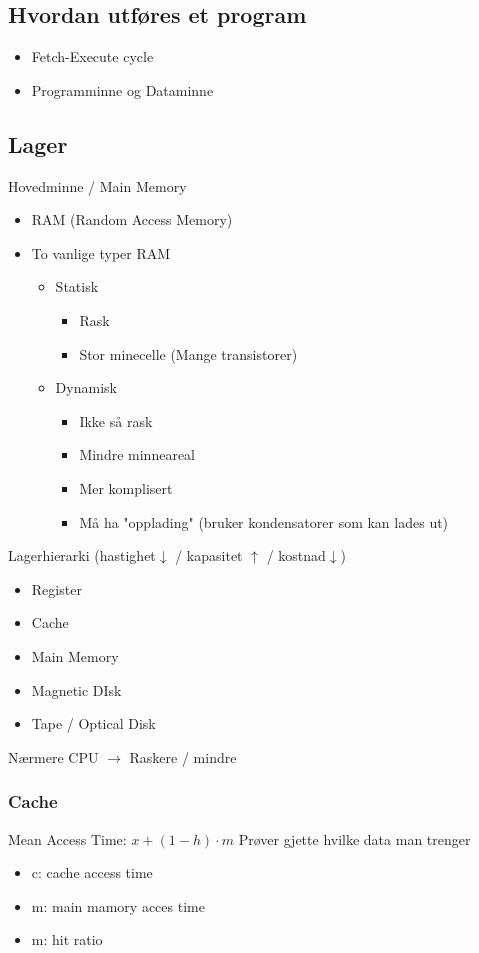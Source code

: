 \documentclass{article}
\begin{document}
		\subsection{Hvordan utføres et program}
			\begin{itemize}
				\item Fetch-Execute cycle
				\item Programminne og Dataminne
			\end{itemize}
		\subsection{Lager}
			Hovedminne / Main Memory
			\begin{itemize}
				\item RAM (Random Access Memory)
				\item To vanlige typer RAM
					\begin{itemize}
						\item Statisk
							\begin{itemize}
								\item Rask
								\item Stor minecelle (Mange transistorer)
							\end{itemize}
						\item Dynamisk
							\begin{itemize}
								\item Ikke så rask
								\item Mindre minneareal
								\item Mer komplisert
								\item Må ha "opplading" (bruker kondensatorer som kan lades ut)
							\end{itemize}
					\end{itemize}
			\end{itemize}
			Lagerhierarki (hastighet$\downarrow$ / kapasitet $\uparrow$ / kostnad$\downarrow$)
			
			\begin{itemize}
				\item Register
				\item Cache
				\item Main Memory
				\item Magnetic DIsk
				\item Tape / Optical Disk
			\end{itemize}
		Nærmere CPU $\rightarrow$ Raskere / mindre
			\subsubsection{Cache}
				Mean Access Time: $x + (1 - h) \cdot m$
				Prøver gjette hvilke data man trenger
				\begin{itemize}
					\item c: cache access time
					\item m: main mamory acces time
					\item m: hit ratio
				\end{itemize}
\end{document}

